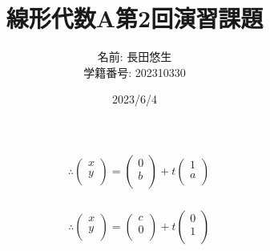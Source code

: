 \documentclass[dvipdfmx,uplatex]{jsarticle}
\title{線形代数A第2回演習課題}
\author{
    名前: 長田悠生\\
    学籍番号: 202310330
    }
\date{2023/6/4}
\begin{document}
  \begin{titlepage}
    \maketitle
    \begin{center}
      \textmc{\HUGE \LaTeX}
    \end{center}
    \thispagestyle{empty}
  \end{titlepage}

  \begin{equation}
    \begin{aligned}
        &\therefore \begin{pmatrix} x\\ y\\ \end{pmatrix} = \begin{pmatrix} 0\\ b\\ \end{pmatrix} + t\begin{pmatrix} 1\\ a\\ \end{pmatrix}\nonumber\\
    \end{aligned}
  \end{equation}

  \begin{equation}
    \begin{aligned}
        &\therefore \begin{pmatrix} x\\ y\\ \end{pmatrix} = \begin{pmatrix} c\\ 0\\ \end{pmatrix} + t\begin{pmatrix} 0\\ 1\\ \end{pmatrix}\nonumber\\
    \end{aligned}
  \end{equation}
\end{document}
